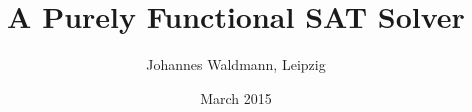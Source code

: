 \documentclass[12pt]{article}
\title{A Purely Functional SAT Solver}
\author{Johannes Waldmann, Leipzig}
\date{March 2015}
\begin{document}
\maketitle









\nocite{*}

\end{document}
